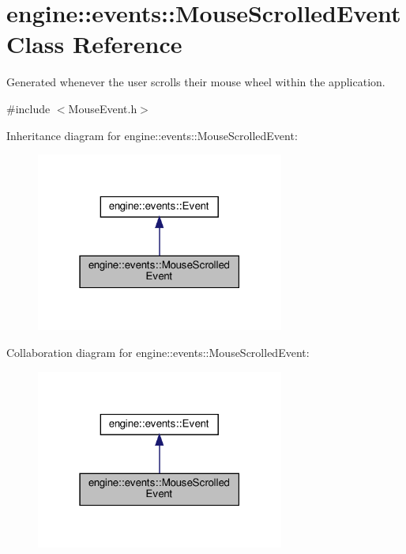 \hypertarget{classengine_1_1events_1_1MouseScrolledEvent}{}\section{engine\+:\+:events\+:\+:Mouse\+Scrolled\+Event Class Reference}
\label{classengine_1_1events_1_1MouseScrolledEvent}


Generated whenever the user scrolls their mouse wheel within the application.  




{\ttfamily \#include $<$Mouse\+Event.\+h$>$}



Inheritance diagram for engine\+:\+:events\+:\+:Mouse\+Scrolled\+Event\+:\nopagebreak
\begin{figure}[H]
\begin{center}
\leavevmode
\includegraphics[width=231pt]{classengine_1_1events_1_1MouseScrolledEvent__inherit__graph}
\end{center}
\end{figure}


Collaboration diagram for engine\+:\+:events\+:\+:Mouse\+Scrolled\+Event\+:\nopagebreak
\begin{figure}[H]
\begin{center}
\leavevmode
\includegraphics[width=231pt]{classengine_1_1events_1_1MouseScrolledEvent__coll__graph}
\end{center}
\end{figure}
